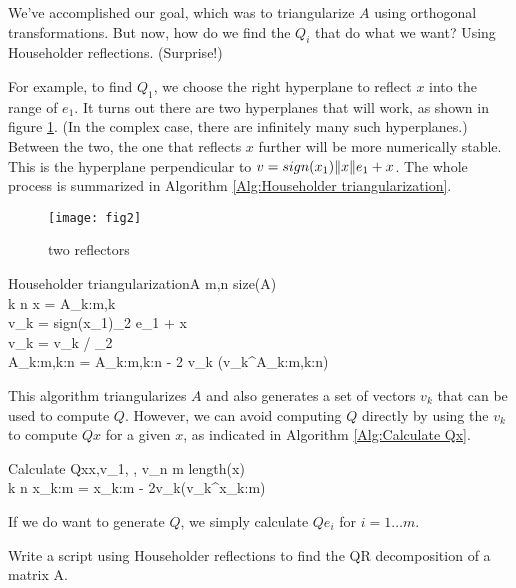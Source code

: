 We've accomplished our goal, which was to triangularize $A$ using orthogonal transformations. But now, how do we find the $Q_i$ that do what we want? Using Householder reflections. (Surprise!)

For example, to find $Q_1$, we choose the right hyperplane to reflect $x$ into the range of $e_1$. It turns out there are two hyperplanes that will work, as shown in figure \ref{fig:two reflectors}. (In the complex case, there are infinitely many such hyperplanes.) Between the two, the one that reflects $x$ further will be more numerically stable. This is the hyperplane perpendicular to \textbf{$v = sign(x_1)\lVert x\rVert e_1 + x$}. The whole process is summarized in Algorithm \ref{Alg:Householder triangularization}.


\begin{figure}
	\centering
	\texttt{[image: fig2]}
	\caption{two reflectors}
	\label{fig:two reflectors}
\end{figure}

\begin{pseudo}{Householder triangularization}{A}
\label{Alg:Householder triangularization}
m,n \GETS size(A)\\
\FOR k  \TO n \DO
\BEGIN
   x = A_{k:m,k}\\
   v_k = sign(x_1)_2 e_1 + x\\
   v_k = v_k / _2\\
   A_{k:m,k:n} = A_{k:m,k:n} - 2 v_k (v_k^\ast A_{k:m,k:n})
\END
\end{pseudo}

This algorithm triangularizes $A$ and also generates a set of vectors $v_k$ that can be used to compute $Q$. However, we can avoid computing $Q$ directly by using the $v_k$ to compute $Qx$ for a given $x$, as indicated in Algorithm \ref{Alg:Calculate Qx}.


\begin{pseudo}{Calculate Qx}{x,v_1, \hdots , v_n}
\label{Alg:Calculate Qx}
m \GETS length(x)\\
\FOR k \GETS  n  \DO 
	x_{k:m} = x_{k:m} - 2v_k(v_k^\ast x_{k:m})
\end{pseudo}

If we do want to generate $Q$, we simply calculate $Qe_i$ for $i = 1 \hdots m$.

\begin{problem}
Write a script using Householder reflections to find the QR decomposition of a matrix A.
\end{problem}

